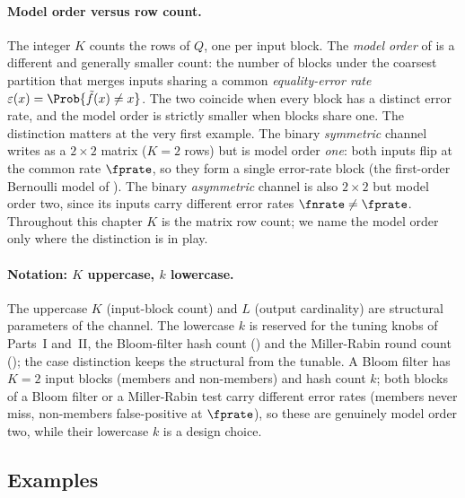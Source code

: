 \paragraph{Model order versus row count.}
The integer $K$ counts the rows of $Q$, one per input block. The
\emph{model order} of  is a different and generally
smaller count: the number of blocks under the coarsest partition that merges
inputs sharing a common \emph{equality-error rate} $\varepsilon(x) =
\Prob{\tilde{f}(x) \neq x}$. The two coincide when every block has a distinct
error rate, and the model order is strictly smaller when blocks share one. The
distinction matters at the very first example. The binary \emph{symmetric}
channel writes as a $2 \times 2$ matrix ($K = 2$ rows) but is model order
\emph{one}: both inputs flip at the common rate $\fprate$, so they form a single
error-rate block (the first-order Bernoulli model of ).
The binary \emph{asymmetric} channel is also $2 \times 2$ but model order two,
since its inputs carry different error rates $\fnrate \neq \fprate$. Throughout
this chapter $K$ is the matrix row count; we name the model order only where the
distinction is in play.

\paragraph{Notation: $K$ uppercase, $k$ lowercase.}
The uppercase $K$ (input-block count) and $L$ (output cardinality) are
structural parameters of the channel. The lowercase $k$ is reserved for the
tuning knobs of Parts~I and~II, the Bloom-filter hash count
() and the Miller-Rabin round count
(); the case distinction keeps the structural from the
tunable. A Bloom filter has $K = 2$ input blocks (members and non-members) and
hash count $k$; both blocks of a Bloom filter or a Miller-Rabin test carry
different error rates (members never miss, non-members false-positive at
$\fprate$), so these are genuinely model order two, while their lowercase $k$ is
a design choice.

\subsection*{Examples}

